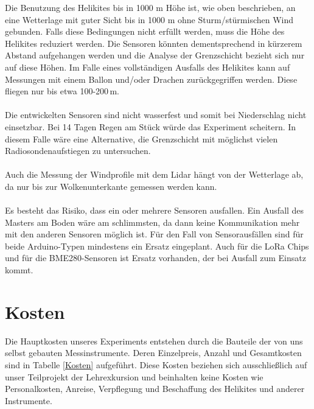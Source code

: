 \documentclass[a4paper,11pt,DIV=calc,tablecaptionabove,headinclude,twoside]{article}
\begin{document}
Die Benutzung des Helikites bis in 1000 m Höhe ist, wie oben beschrieben, an eine Wetterlage mit guter Sicht bis in 1000 m ohne Sturm/stürmischen Wind gebunden. Falls diese Bedingungen nicht erfüllt werden, muss die Höhe des Helikites reduziert werden. Die Sensoren könnten dementsprechend in kürzerem Abstand aufgehangen werden und die Analyse der Grenzschicht bezieht sich nur auf diese Höhen. Im Falle eines vollständigen Ausfalls des Helikites kann auf Messungen mit einem Ballon und/oder Drachen zurückgegriffen werden. Diese fliegen nur bis etwa 100-200\,m. \\\\
Die entwickelten Sensoren sind nicht wasserfest und somit bei Niederschlag nicht einsetzbar. Bei 14 Tagen Regen am Stück würde das Experiment scheitern. In diesem Falle wäre eine Alternative, die Grenzschicht mit möglichst vielen Radiosondenaufstiegen zu untersuchen. \\\\
Auch die Messung der Windprofile mit dem Lidar hängt von der Wetterlage ab, da nur bis zur Wolkenunterkante gemessen werden kann. \\\\
Es besteht das Risiko, dass ein oder mehrere Sensoren ausfallen. Ein Ausfall des Masters am Boden wäre am schlimmsten, da dann keine Kommunikation mehr mit den anderen Sensoren möglich ist. Für den Fall von Sensorausfällen sind für beide Arduino-Typen mindestens ein Ersatz eingeplant. Auch für die LoRa Chips und für die BME280-Sensoren ist Ersatz vorhanden, der bei Ausfall zum Einsatz kommt.

\section{Kosten}

Die Hauptkosten unseres Experiments entstehen durch die Bauteile der von uns selbst gebauten Messinstrumente. Deren Einzelpreis, Anzahl und Gesamtkosten sind in Tabelle \ref{Kosten} aufgeführt. Diese Kosten beziehen sich ausschließlich auf unser Teilprojekt der Lehrexkursion und beinhalten keine Kosten wie Personalkosten, Anreise, Verpflegung und Beschaffung des Helikites und anderer Instrumente. 
\end{document}
